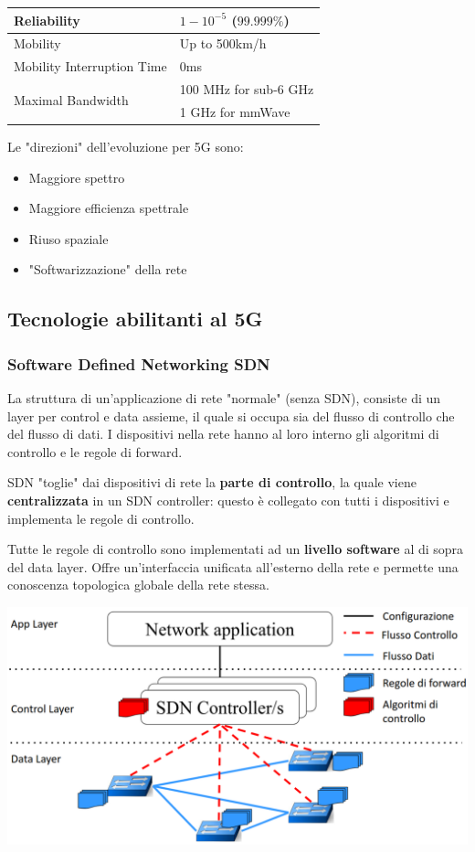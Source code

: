 \begin{center}
{\begin{tabular}{l | l}
			Reliability & $1-10^{-5}$ ($99.999\%$) \\
			\hline
			
			Mobility & Up to 500km/h \\
			\hline
			
			Mobility Interruption Time & 0ms \\
			\hline
			
			\multirow{2}{*}{Maximal Bandwidth} & 100 MHz for sub-6 GHz \\
			\cline{2-2}
			& 1 GHz for mmWave \\
			\hline
	\end{tabular}}
\end{center}

Le "direzioni" dell'evoluzione per 5G sono: 
\begin{itemize}
	\item Maggiore spettro
	\item Maggiore efficienza spettrale
	\item Riuso spaziale
	\item "Softwarizzazione" della rete
\end{itemize}


\subsection{Tecnologie abilitanti al 5G}

\subsubsection{Software Defined Networking SDN}

La struttura di un'applicazione di rete "normale" (senza SDN), consiste di un layer per control e data assieme, il quale si occupa sia del flusso di controllo che del flusso di dati. I dispositivi nella rete hanno al loro interno gli algoritmi di controllo e le regole di forward. 

SDN "toglie" dai dispositivi di rete la \textbf{parte di controllo}, la quale viene \textbf{centralizzata} in un SDN controller: questo è collegato con tutti i dispositivi e implementa le regole di controllo. 

Tutte le regole di controllo sono implementati ad un \textbf{livello software} al di sopra del data layer. Offre un'interfaccia unificata all'esterno della rete e permette una conoscenza topologica globale della rete stessa.

\begin{center}
	\includegraphics[width=0.8\linewidth]{img/5g/sdn1}
\end{center}

